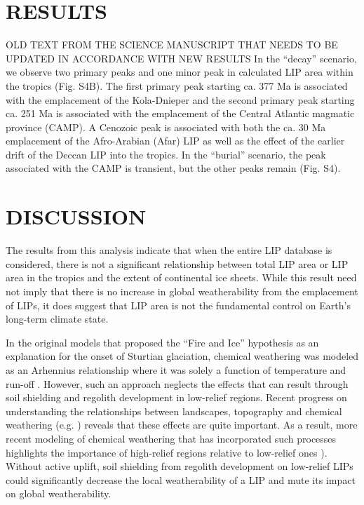 \documentclass[11pt,letterpaper]{article}
\begin{document}
\section*{RESULTS}

OLD TEXT FROM THE SCIENCE MANUSCRIPT THAT NEEDS TO BE UPDATED IN ACCORDANCE WITH NEW RESULTS
In the “decay” scenario, we observe two primary peaks and one minor peak in calculated LIP area within the tropics (Fig. S4B). The first primary peak starting ca. 377 Ma is associated with the emplacement of the Kola-Dnieper and the second primary peak starting ca. 251 Ma is associated with the emplacement of the Central Atlantic magmatic province (CAMP). A Cenozoic peak is associated with both the ca. 30 Ma emplacement of the Afro-Arabian (Afar) LIP as well as the effect of the earlier drift of the Deccan LIP into the tropics. In the “burial” scenario, the peak associated with the CAMP is transient, but the other peaks remain (Fig. S4).

\section*{DISCUSSION}

The results from this analysis indicate that when the entire LIP database is considered, there is not a significant relationship between total LIP area or LIP area in the tropics and the extent of continental ice sheets. While this result need not imply that there is no increase in global weatherability from the emplacement of LIPs, it does suggest that LIP area is not the fundamental control on Earth's long-term climate state.

In the original models that proposed the ``Fire and Ice'' hypothesis as an explanation for the onset of Sturtian glaciation, chemical weathering was modeled as an Arhennius relationship where it was solely a function of temperature and run-off \citep{Donnadieu2004a}. However, such an approach neglects the effects that can result through soil shielding and regolith development in low-relief regions. Recent progress on understanding the relationships between landscapes, topography and chemical weathering (e.g. \cite{Maher2014a}) reveals that these effects are quite important. As a result, more recent modeling of chemical weathering that has incorporated such processes highlights the importance of high-relief regions relative to low-relief ones \citep{Godderis2017b}). Without active uplift, soil shielding from regolith development on low-relief LIPs could significantly decrease the local weatherability of a LIP and mute its impact on global weatherability. 
\end{document}
